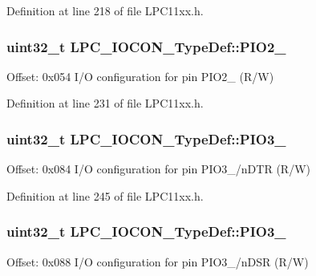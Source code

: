Definition at line 218 of file L\+P\+C11xx.\+h.

\subsubsection[{\texorpdfstring{P\+I\+O2\+\_\+9}{PIO2_9}}]{ uint32\+\_\+t L\+P\+C\+\_\+\+I\+O\+C\+O\+N\+\_\+\+Type\+Def\+::\+P\+I\+O2\+\_}\hypertarget{group___l_p_c11xx___definitions_ga6ca4c8c499eb2f54c10dad6a8b05eacd}{}\label{group___l_p_c11xx___definitions_ga6ca4c8c499eb2f54c10dad6a8b05eacd}
Offset\+: 0x054 I/O configuration for pin P\+I\+O2\+\_ (R/W) 

Definition at line 231 of file L\+P\+C11xx.\+h.

\subsubsection[{\texorpdfstring{P\+I\+O3\+\_\+0}{PIO3_0}}]{ uint32\+\_\+t L\+P\+C\+\_\+\+I\+O\+C\+O\+N\+\_\+\+Type\+Def\+::\+P\+I\+O3\+\_}\hypertarget{group___l_p_c11xx___definitions_ga2d5f8bc14da9cb94cb5d8184443ba458}{}\label{group___l_p_c11xx___definitions_ga2d5f8bc14da9cb94cb5d8184443ba458}
Offset\+: 0x084 I/O configuration for pin P\+I\+O3\+\_/n\+D\+TR (R/W) 

Definition at line 245 of file L\+P\+C11xx.\+h.

\subsubsection[{\texorpdfstring{P\+I\+O3\+\_\+1}{PIO3_1}}]{ uint32\+\_\+t L\+P\+C\+\_\+\+I\+O\+C\+O\+N\+\_\+\+Type\+Def\+::\+P\+I\+O3\+\_}\hypertarget{group___l_p_c11xx___definitions_gad8af57ebdb3aa3d29df43ad8d316df81}{}\label{group___l_p_c11xx___definitions_gad8af57ebdb3aa3d29df43ad8d316df81}
Offset\+: 0x088 I/O configuration for pin P\+I\+O3\+\_/n\+D\+SR (R/W) 


